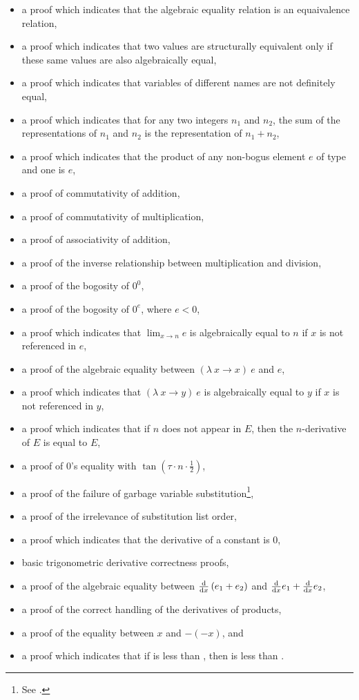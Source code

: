 \documentclass{report}
\begin{document}
\begin{itemize}
 \item a proof which indicates that the algebraic equality relation is an equaivalence relation,
 \item a proof which indicates that two values are structurally equivalent only if these same values are also algebraically equal,
 \item a proof which indicates that variables of different names are not definitely equal,
 \item a proof which indicates that for any two integers \(n_1\) and \(n_2\), the sum of the representations of \(n_1\) and \(n_2\) is the representation of \(n_1 + n_2\),
 \item a proof which indicates that the product of any non-bogus element \(e\) of type  and one is \(e\),
 \item a proof of commutativity of addition,
 \item a proof of commutativity of multiplication,
 \item a proof of associativity of addition,
 \item a proof of the inverse relationship between multiplication and division,
 \item a proof of the bogosity of \(0^0\),
 \item a proof of the bogosity of \(0^e\), where \(e < 0\),
 \item a proof which indicates that \(\lim_{x \rightarrow n} e\) is algebraically equal to \(n\) if \(x\) is not referenced in \(e\),
 \item a proof of the algebraic equality between \(\left(\lambda\ x \rightarrow x\right)\ e\) and \(e\),
 \item a proof which indicates that \(\left(\lambda\ x \rightarrow y\right)\ e\) is algebraically equal to \(y\) if \(x\) is not referenced in \(y\),
 \item a proof which indicates that if \(n\) does not appear in \(E\), then the \(n\)-derivative of \(E\) is equal to \(E\),
 \item a proof of \(0\)'s equality with \(\tan \left(\tau \cdot n \cdot \frac12\right)\),
 \item a proof of the failure of garbage variable substitution\footnote{See .},
 \item a proof of the irrelevance of substitution list order,
 \item a proof which indicates that the derivative of a constant is \(0\),
 \item basic trigonometric derivative correctness proofs,
 \item a proof of the algebraic equality between \(\derivative{x} \left(e_1 + e_2\right)\) and \(\derivative{x} e_1 + \derivative{x} e_2\),
 \item a proof of the correct handling of the derivatives of products,
 \item a proof of the equality between \(x\) and \(- \left(- x\right)\), and
 \item a proof which indicates that if  is less than , then   is less than  .
\end{itemize}
\end{document}
